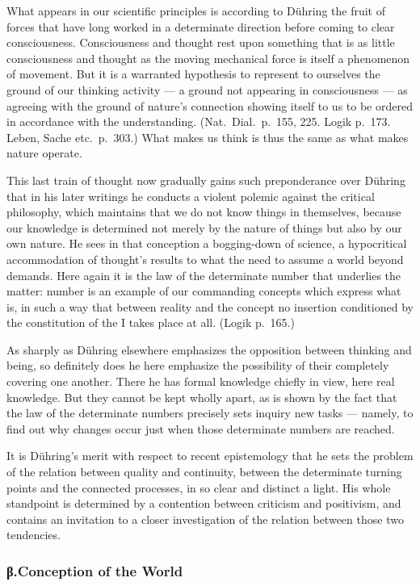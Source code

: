 \documentclass[12pt,a4paper]{book}
\newcommand{\opage}[1]{\marginnote{\footnotesize\textit{[#1]}}}
\begin{document}
What appears in our scientific principles is according to Dühring the fruit of
forces that have long worked in a determinate direction before coming to clear
consciousness. Consciousness and thought rest upon something that is as little
consciousness and thought as the moving mechanical force is itself a phenomenon
of movement. But it is a warranted hypothesis to represent to ourselves the
ground of our thinking activity --- a ground not appearing in consciousness ---
as agreeing with the ground of nature's connection showing itself to us to be
ordered in accordance with the understanding. (Nat.\ Dial.\ p.~155, 225. Logik
p.~173. Leben, Sache etc.\ p.~303.) What makes us think is thus the same as what
makes nature operate.

This last train of thought now gradually gains such preponderance over Dühring
that in his later writings he conducts a violent polemic against the critical
philosophy, which maintains that we do not know things in themselves, because our
knowledge is determined not merely by the nature of things but also by our own
nature. He sees in that conception a bogging-down of science, a hypocritical
accommodation of thought's results to what the need to assume a world beyond
demands. Here again it is the law of the determinate number that underlies the
matter: number is an example of our commanding concepts which express what is, in
such a way that between reality and the concept no insertion conditioned by the
constitution of the I takes place at all. (Logik p.~165.)

As sharply as Dühring elsewhere emphasizes the opposition between thinking and
being, so definitely does he here emphasize the possibility of their completely
covering one another. There he has formal knowledge chiefly in view, here real
knowledge. But they cannot be kept wholly apart, as is shown by the fact that the
law of the determinate numbers precisely sets inquiry new tasks --- namely, to
find out why changes occur just when those determinate numbers are reached.

It is Dühring's merit with respect to recent epistemology that he sets the
problem of the relation between quality and \opage{561}continuity, between the determinate
turning points and the connected processes, in so clear and distinct a light. His
whole standpoint is determined by a contention between criticism and positivism,
and contains an invitation to a closer investigation of the relation between
those two tendencies.

\subsubsection*{β.\quad Conception of the World}
\end{document}
